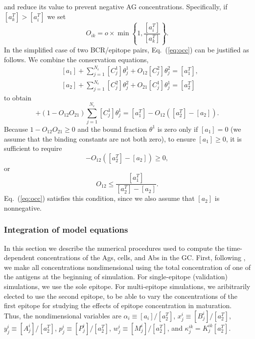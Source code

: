\documentclass[utf8]{frontiersHLTH}%
\newcommand{\eq}[1] {Eq.~(\ref{eq:#1})}
\begin{document}
and reduce its value to prevent negative AG concentrations.
Specifically, if $[a^T_k]>[a^T_i]$ we set
\begin{equation}
 O_{ik} = o \times \min\left\{1,\frac{[a^T_i]}{[a^T_k]}\right\}.
 \label{eq:occ}
\end{equation}
In the simplified case of two BCR/epitope pairs, \eq{occ} can be justified as follows.
We combine the conservation equations,
\begin{equation}
 \begin{aligned}
 &[a_1] + \sum^{N_\epsilon}_{j=1} [C^1_j]\theta^1_j + O_{12}[C^2_j]\theta^2_j =[a^T_1],\\
 &[a_2] + \sum^{N_\epsilon}_{j=1} [C^2_j]\theta^2_j + O_{21}[C^1_j]\theta^1_j =[a^T_2]
 \end{aligned}
 \label{eq:ag4}
\end{equation}
to obtain
\begin{equation}
 [a_1] + (1-O_{12}O_{21})\sum^{N_\epsilon}_{j=1} [C^1_j]\theta^1_j = [a^T_1] - O_{12}([a^T_2] - [a_2]).
 \label{eq:ag5}
\end{equation}
Because $1-O_{12}O_{21}\ge0$ and the bound fraction $\theta^1$ is zero only if $[a_1]=0$ (we assume that the binding constants
are not both zero), to ensure $[a_1]\ge0$, it is sufficient to require
\begin{equation}
 [a^T_1] - O_{12}([a^T_2] - [a_2])\ge0,
 \label{eq:ag6}
\end{equation}
or
\begin{equation}
 O_{12}\le\frac{[a^T_1]}{[a^T_2] - [a_2]}.
 \label{eq:ag7}
\end{equation}
\eq{occ} satisfies this condition, since we also assume that $[a_2]$ is nonnegative.

\subsubsection{Integration of model equations}
\label{sec:integration}
In this section we describe the numerical procedures used to compute the
time-dependent concentrations of the Ags, cells, and Abs in the GC.
First, following \citet{kepler93}, we make all concentrations
nondimensional using the total concentration of one of the antigens at the beginning of simulation.
For single-epitope (validation) simulations, we use the sole epitope.
For multi-epitope simulations, we aribitrarily elected to use the second epitope,
to be able to vary the concentrations of the first epitope for
studying the effects of epitope concentration in maturation.
Thus, the nondimensional variables are
$\alpha_i\equiv[a_i]/[a_2^T]$, $x^i_j\equiv[B^i_j]/[a_2^T]$,
$y^i_j\equiv[A^i_j]/[a_2^T]$,
$p^i_j\equiv[P^i_j]/[a_2^T]$, $w^i_j\equiv[M^i_j]/[a_2^T]$, and
$\kappa^{ik}_j=K^{ik}_j[a_2^T]$.
\end{document}
